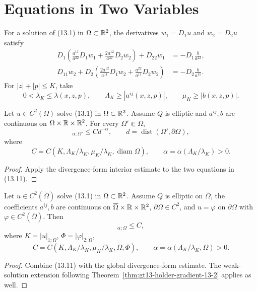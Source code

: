 \section{Equations in Two Variables}

For a solution of \textup{(13.1)} in $\Omega\subset\mathbb{R}^2$, the derivatives
$w_1=D_1u$ and $w_2=D_2u$ satisfy
\begin{equation}
\begin{aligned}
D_1\!\left(\frac{a^{11}}{a^{22}}D_1w_1
 +\frac{2a^{12}}{a^{22}}D_2w_2\right)+D_{22}w_1
 &=-D_1\frac b{a^{22}},\\
D_{11}w_2+D_2\!\left(\frac{2a^{12}}{a^{11}}D_1w_2
 +\frac{a^{22}}{a^{11}}D_2w_2\right)
 &=-D_2\frac b{a^{11}}.
\end{aligned}
\tag{13.11}
\end{equation}
For $|z|+|p|\le K$, take
\begin{equation}
0<\lambda_K\le\lambda(x,z,p),\qquad
\Lambda_K\ge|a^{ij}(x,z,p)|,\qquad
\mu_K\ge|b(x,z,p)|.
\tag{13.12}
\end{equation}

\begin{theorem}
\label{thm:gt13-holder-gradient-13-3}
Let $u\in C^2(\Omega)$ solve \textup{(13.1)} in $\Omega\subset\mathbb{R}^2$.
Assume $Q$ is elliptic and $a^{ij},b$ are continuous on
$\Omega\times\mathbb{R}\times\mathbb{R}^2$.  For every $\Omega'\Subset\Omega$,
\begin{equation}
[Du]_{\alpha;\Omega'}\le Cd^{-\alpha},
\qquad d=\operatorname{dist}(\Omega',\partial\Omega),
\tag{13.13}
\end{equation}
where
\[
C=C(K,\Lambda_K/\lambda_K,\mu_K/\lambda_K,
\operatorname{diam}\Omega),
\qquad
\alpha=\alpha(\Lambda_K/\lambda_K)>0.
\]
\end{theorem}
\begin{proof}
\sketch Apply the divergence-form interior estimate to the two equations
in \textup{(13.11)}.
\end{proof}

\begin{theorem}
\label{thm:gt13-holder-gradient-13-4}
Let $u\in C^2(\overline\Omega)$ solve \textup{(13.1)} in
$\Omega\subset\mathbb{R}^2$.  Assume $Q$ is elliptic on $\overline\Omega$, the
coefficients $a^{ij},b$ are continuous on
$\overline\Omega\times\mathbb{R}\times\mathbb{R}^2$, $\partial\Omega\in C^2$, and
$u=\varphi$ on $\partial\Omega$ with
$\varphi\in C^2(\overline\Omega)$.  Then
\begin{equation}
[Du]_{\alpha;\Omega}\le C,
\tag{13.14}
\end{equation}
where $K=|u|_{1;\Omega}$, $\Phi=|\varphi|_{2;\Omega}$,
\[
C=C(K,\Lambda_K/\lambda_K,\mu_K/\lambda_K,\Omega,\Phi),
\qquad
\alpha=\alpha(\Lambda_K/\lambda_K,\Omega)>0.
\]
\end{theorem}
\begin{proof}
\sketch Combine \textup{(13.11)} with the global divergence-form estimate.
The weak-solution extension following Theorem~\ref{thm:gt13-holder-gradient-13-2}
applies as well.
\end{proof}

